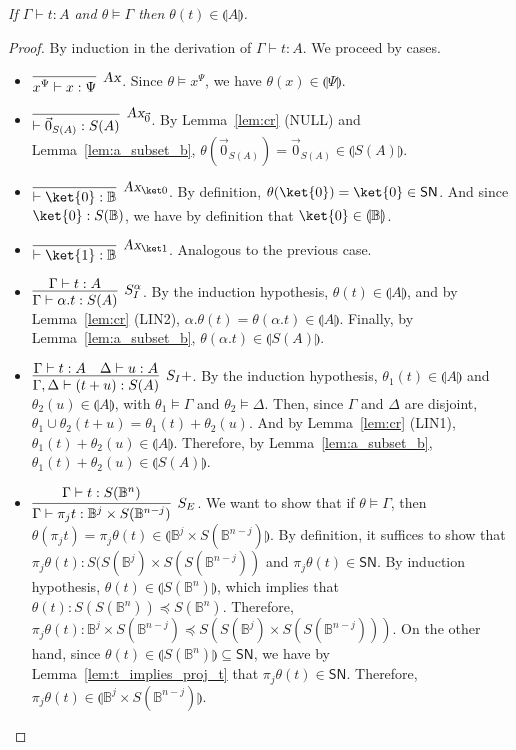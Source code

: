 \documentclass[preprint]{elsarticle}
\newcommand\interp[1]{\llparenthesis #1\rrparenthesis}
\newcommand\SN{\mathsf{SN}}
\newcommand\xrecap[4]{\noindent {\bf #1 \ref{#3} (#2).} \emph{#4}}
\newcommand\B{\ensuremath{\mathbb B}}
\newcommand\z[1][A]{\vec 0_{S(#1)}}
\newcommand\nullvec[1]{\z[#1]}
\newcommand\tax{\textsl{Ax}}
\newcommand{\proj}[2]{\pi_{#1} #2}
\begin{document}
\xrecap{Lemma}{Adequacy}{lem:adequacy}{
  If \( \Gamma \vdash t:A \) and \( \theta \vDash \Gamma \) then \( \theta(t)
  \in \interp{A} \).
}
\begin{proof}
  By induction in the derivation of $\Gamma\vdash t:A$.
  We proceed by cases.
  \begin{itemize}
  \item \( \vcenter{\infer[\tax]{x^\Psi \vdash x : \Psi}{}} \). Since
    $\theta\vDash x^\Psi$, we have $\theta(x)\in\interp{\Psi}$.

  \item \(\vcenter{\infer[\tax_{\vec 0}]{\vdash \nullvec{A}: S(A)}{}}\). By Lemma~\ref{lem:cr} (NULL) and Lemma~\ref{lem:a_subset_b}, $\theta(\z)=\z\in\interp{S(A)}$.

  \item \(\vcenter{\infer[\tax_{\ket 0}]{\vdash \ket{0}: \B}{}}\). By definition, \( \theta(\ket{0}) = \ket{0} \in \SN \). And since \( \ket{0} : S(\B) \), we have by definition that \( \ket{0} \in \interp{\B} \).

  \item \(\vcenter{\infer[\tax_{\ket 1}]{\vdash \ket{1}: \B}{}}\). Analogous to the previous case.

  \item \( \vcenter{\infer[S_I^\alpha]{\Gamma \vdash \alpha . t : S(A)}{\Gamma \vdash
        t: A}} \). By the induction hypothesis, \( \theta(t)\in\interp A \), and by Lemma~\ref{lem:cr} (LIN2), \( \alpha . \theta(t) = \theta(\alpha . t) \in \interp{A} \). Finally, by Lemma~\ref{lem:a_subset_b}, \( \theta(\alpha . t) \in \interp{S(A)} \).

  \item \( \vcenter{\infer[S_I +]{\Gamma, \Delta \vdash (t + u): S(A)}{\Gamma \vdash t : A & \Delta
        \vdash u : A}} \).
    By the induction hypothesis, $\theta_1(t)\in\interp A$ and
    $\theta_2(u)\in\interp A$, with $\theta_1\vDash\Gamma$ and
    $\theta_2\vDash\Delta$. Then, since \( \Gamma \) and \( \Delta \) are disjoint, $\theta_1\cup\theta_2(t+u)=\theta_1(t)+\theta_2(u)$. And by Lemma~\ref{lem:cr} (LIN1), \( \theta_1(t)+\theta_2(u) \in \interp{A} \). Therefore, by Lemma~\ref{lem:a_subset_b}, \( \theta_1(t)+\theta_2(u)\in\interp{S(A)} \).

  \item \( \vcenter{\infer[S_E]{\Gamma \vdash \pi_{j}{t} : \B^j \times S(\B^{n - j})}{\Gamma
        \vdash t : S(\B^n)}} \).
    We want to show that if \( \theta \models \Gamma \), then \( \theta(\proj{j}{t}) = \proj{j}{\theta(t)} \in \interp{\B^j \times S(\B^{n - j})} \). By definition, it suffices to show that \( \proj{j}{\theta(t)} : S(S(\B^j) \times S(S(\B^{n - j})) \) and \( \proj{j}{\theta(t)} \in \SN \).
    By induction hypothesis, \( \theta(t) \in \interp{S(\B^n)} \), which implies that \( \theta(t) : S(S(\B^n)) \preceq S(\B^n) \). Therefore, \( \proj{j}{\theta(t)} : \B^j \times S(\B^{n - j}) \preceq S(S(\B^j) \times S(S(\B^{n - j}))) \).
    On the other hand, since \( \theta(t) \in \interp{S(\B^n)} \subseteq \SN \), we have by Lemma~\ref{lem:t_implies_proj_t} that \( \proj{j}{\theta(t)} \in \SN \).
    Therefore, \( \proj{j}{\theta(t)} \in \interp{\B^j \times S(\B^{n - j})} \).


\end{itemize}
\end{proof}
\end{document}
